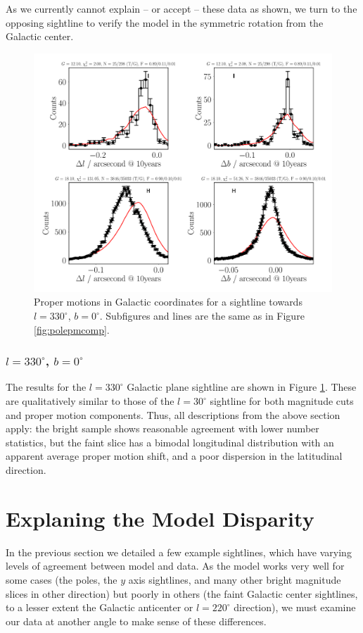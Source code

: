 \documentclass[fleqn,usenatbib]{mnras}
\begin{document}
As we currently cannot explain -- or accept -- these data as shown, we turn to the opposing sightline to verify the model in the symmetric rotation from the Galactic center.

\begin{figure}
    \centering
    \includegraphics[width=\columnwidth]{Plots/plots_pm_gaia_330_0.pdf}
    \caption{Proper motions in Galactic coordinates for a sightline towards $l = 330^\circ$, $b = 0^\circ$.
    Subfigures and lines are the same as in Figure \ref{fig:polepmcomp}.}
    \label{fig:l330comp}
\end{figure}

\subsubsection{$l = 330^\circ$, $b = 0^\circ$}
The results for the $l = 330^\circ$ Galactic plane sightline are shown in Figure \ref{fig:l330comp}.
These are qualitatively similar to those of the $l = 30^\circ$ sightline for both magnitude cuts and proper motion components.
Thus, all descriptions from the above section apply: the bright sample shows reasonable agreement with lower number statistics, but the faint slice has a bimodal longitudinal distribution with an apparent average proper motion shift, and a poor dispersion in the latitudinal direction.

\section{Explaning the Model Disparity}
In the previous section we detailed a few example sightlines, which have varying levels of agreement between model and data.
As the model works very well for some cases (the poles, the $y$ axis sightlines, and many other bright magnitude slices in other direction) but poorly in others (the faint Galactic center sightlines, to a lesser extent the Galactic anticenter or $l = 220^\circ$ direction), we must examine our data at another angle to make sense of these differences.
\end{document}
